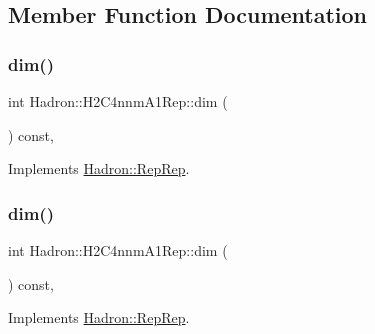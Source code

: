 \subsection{Member Function Documentation}
\mbox{\label{structHadron_1_1H2C4nnmA1Rep_a228e6f48d234472be551bebef00ece06}} 
\subsubsection{\texorpdfstring{dim()}{dim()}\hspace{0.1cm}{\footnotesize\ttfamily [1/5]}}
{\footnotesize\ttfamily int Hadron\+::\+H2\+C4nnm\+A1\+Rep\+::dim (\begin{DoxyParamCaption}{ }\end{DoxyParamCaption}) const\hspace{0.3cm}{\ttfamily [inline]}, {\ttfamily [virtual]}}



Implements \mbox{\hyperlink{structHadron_1_1RepRep_a92c8802e5ed7afd7da43ccfd5b7cd92b}{Hadron\+::\+Rep\+Rep}}.

\mbox{\label{structHadron_1_1H2C4nnmA1Rep_a228e6f48d234472be551bebef00ece06}} 
\subsubsection{\texorpdfstring{dim()}{dim()}\hspace{0.1cm}{\footnotesize\ttfamily [2/5]}}
{\footnotesize\ttfamily int Hadron\+::\+H2\+C4nnm\+A1\+Rep\+::dim (\begin{DoxyParamCaption}{ }\end{DoxyParamCaption}) const\hspace{0.3cm}{\ttfamily [inline]}, {\ttfamily [virtual]}}



Implements \mbox{\hyperlink{structHadron_1_1RepRep_a92c8802e5ed7afd7da43ccfd5b7cd92b}{Hadron\+::\+Rep\+Rep}}.

\mbox{\label{structHadron_1_1H2C4nnmA1Rep_a228e6f48d234472be551bebef00ece06}} 
